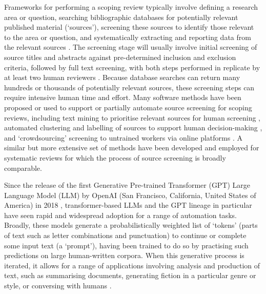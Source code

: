\documentclass[10pt,a4paper,twocolumn]{article}
\begin{document}
Frameworks for performing a scoping review typically involve defining a research area or question, searching bibliographic databases for potentially relevant published material (`sources'), screening these sources to identify those relevant to the area or question, and systematically extracting and reporting data from the relevant sources \cite{JBI.2015, Arksey.2005}. The screening stage will usually involve initial screening of source titles and abstracts against pre-determined inclusion and exclusion criteria, followed by full text screening, with both steps performed in replicate by at least two human reviewers \cite{Peters.2020, JBI.2020, Pham.2014}. Because database searches can return many hundreds or thousands of potentially relevant sources, these screening steps can require intensive human time and effort. Many software methods have been proposed or used to support or partially automate source screening for scoping reviews, including text mining to prioritise relevant sources for human screening \cite{Shemilt.2014, Howard.2016, Chai.2021}, automated clustering and labelling of sources to support human decision-making \cite{Stansfield.2013}, and `crowdsourcing' screening to untrained workers via online platforms \cite{Mortensen.2017}. A similar but more extensive set of methods have been developed and employed for systematic reviews \cite{Khalil.2022, Gates.2019} for which the process of source screening is broadly comparable.

Since the release of the first Generative Pre-trained Transformer (GPT) Large Language Model (LLM) by OpenAI (San Francisco, California, United States of America) in 2018 \cite{Radford.2018}, transformer-based LLMs and the GPT lineage in particular have seen rapid and widespread adoption for a range of automation tasks. Broadly, these models generate a probabilistically weighted list of `tokens' (parts of text such as letter combinations and punctuation) to continue or complete some input text (a `prompt'), having been trained to do so by practising such predictions on large human-written corpora. When this generative process is iterated, it allows for a range of applications involving analysis and production of text, such as summarising documents, generating fiction in a particular genre or style, or conversing with humans \cite{OpenAI.2023}.
\end{document}
